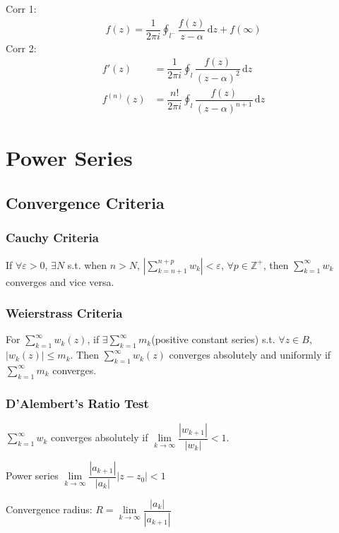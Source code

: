 \documentclass[10pt, a4paper]{article}
\def\d{\,\mathrm{d}}
\def\epsilon{\varepsilon}
\begin{document}
\begin{multicols}{2}
			Corr 1:
			\begin{align}
				f(z) = \dfrac{1}{2\pi i}\oint_{l^-} \dfrac{f(z)}{z - \alpha}\d z + f(\infty)
			\end{align}
			Corr 2:
			\begin{align}
				f'(z) &= \dfrac{1}{2\pi i}\oint_l \dfrac{f(z)}{(z - \alpha)^2}\d z\\
				f^{(n)}(z) &= \dfrac{n!}{2\pi i}\oint_l \dfrac{f(z)}{(z - \alpha)^{n+1}}\d z
			\end{align}
		
	\section{Power Series}
		
		\subsection{Convergence Criteria}
		
			\subsubsection{Cauchy Criteria}
			If $\forall \epsilon > 0$, $\exists N$ s.t. when $n > N$, $\displaystyle\left|\sum_{k=n+1}^{n+p}w_k\right| < \epsilon$, $\forall p \in \mathbb{Z}^+$, then $\displaystyle \sum_{k = 1}^{\infty}w_k$ converges and vice versa.
			
			\subsubsection{Weierstrass Criteria}
			For $\displaystyle \sum_{k = 1}^{\infty}w_k(z)$, if $\exists \displaystyle \sum_{k=1}^{\infty}m_k$(positive constant series) s.t. $\forall z \in B$, $|w_k(z)| \leq m_k$. Then $\displaystyle \sum_{k = 1}^{\infty}w_k(z)$ converges absolutely and uniformly if $\displaystyle \sum_{k=1}^{\infty}m_k$ converges.
			
			\subsubsection{D'Alembert's Ratio Test}
			$\displaystyle \sum_{k = 1}^{\infty}w_k$ converges absolutely if $\lim\limits_{k\rightarrow\infty}\dfrac{|w_{k+1}|}{|w_k|} < 1$. 
			
			Power series $\lim\limits_{k\rightarrow\infty}\dfrac{|a_{k+1}|}{|a_k|}|z-z_0| < 1$
			
			Convergence radius: $R = \lim\limits_{k\rightarrow\infty}\dfrac{|a_k|}{|a_{k+1}|}$
			

\end{multicols}
\end{document}
